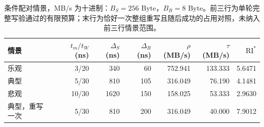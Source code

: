 \begin{table}[htbp]\centering\small
\begin{tabular}{@{}lrrrrrr@{}}\toprule
情景 & $t_m/t_W$ (ns) & $\Delta_S$ (ns) & $\Delta_R$ (ns) & $\rho$ (MB/s) & $\tau$ (MB/s) & $\mathrm{RI}^{*}$\\\midrule
乐观 & 3/20 & 340 & 60 & 752.941 & 133.333 & 5.6471\\
典型 & 5/30 & 810 & 105 & 316.049 & 76.190 & 4.1481\\
悲观 & 10/30 & 1620 & 150 & 158.025 & 53.333 & 2.9630\\
\midrule
典型，重写一次 & 5/30 & 810 & 200 & 316.049 & 40.000 & 7.9012\\
\bottomrule\end{tabular}
\caption{条件配对情景，MB/s 为十进制：$B_S=256$ Byte，$B_R=8$ Byte。前三行为单轮完整写验通过的有限预算；末行为恰好一次整组重写且随后成功的占用对照，未纳入前三行情景范围。}
\end{table}

